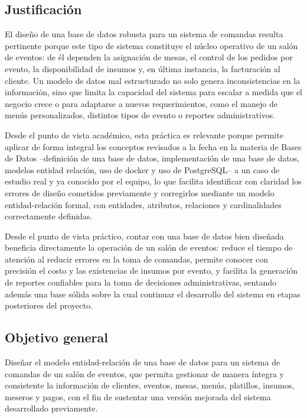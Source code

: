 \subsection{Justificación}

El diseño de una base de datos robusta para un sistema de comandas resulta pertinente porque este tipo de sistema constituye el núcleo operativo de un salón de eventos: de él dependen la asignación de mesas, el control de los pedidos por evento, la disponibilidad de insumos y, en última instancia, la facturación al cliente. Un modelo de datos mal estructurado no solo genera inconsistencias en la información, sino que limita la capacidad del sistema para escalar a medida que el negocio crece o para adaptarse a nuevos requerimientos, como el manejo de menús personalizados, distintos tipos de evento o reportes administrativos.

Desde el punto de vista académico, esta práctica es relevante porque permite aplicar de forma integral los conceptos revisados a la fecha en la materia de Bases de Datos --definición de una base de datos, implementación de una base de datos, modelos entidad relación, uso de docker y uso de PostgreSQL-- a un caso de estudio real y ya conocido por el equipo, lo que facilita identificar con claridad los errores de diseño cometidos previamente y corregirlos mediante un modelo entidad-relación formal, con entidades, atributos, relaciones y cardinalidades correctamente definidas.

Desde el punto de vista práctico, contar con una base de datos bien diseñada beneficia directamente la operación de un salón de eventos: reduce el tiempo de atención al reducir errores en la toma de comandas, permite conocer con precisión el costo y las existencias de insumos por evento, y facilita la generación de reportes confiables para la toma de decisiones administrativas, sentando además una base sólida sobre la cual continuar el desarrollo del sistema en etapas posteriores del proyecto.

\subsection{Objetivo general}

Diseñar el modelo entidad-relación de una base de datos para un sistema de comandas de un salón de eventos, que permita gestionar de manera íntegra y consistente la información de clientes, eventos, mesas, menús, platillos, insumos, meseros y pagos, con el fin de sustentar una versión mejorada del sistema desarrollado previamente.

